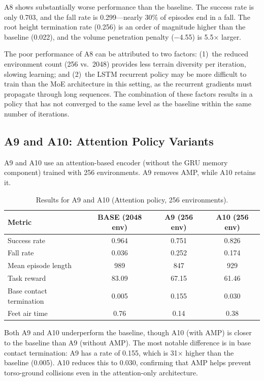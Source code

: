 A8 shows substantially worse performance than the baseline. The success rate is only 0.703, and the fall rate is 0.299---nearly 30\% of episodes end in a fall. The root height termination rate (0.256) is an order of magnitude higher than the baseline (0.022), and the volume penetration penalty ($-$4.55) is 5.5$\times$ larger.

The poor performance of A8 can be attributed to two factors: (1)~the reduced environment count (256 vs.\ 2048) provides less terrain diversity per iteration, slowing learning; and (2)~the LSTM recurrent policy may be more difficult to train than the MoE architecture in this setting, as the recurrent gradients must propagate through long sequences. The combination of these factors results in a policy that has not converged to the same level as the baseline within the same number of iterations.

\subsection{A9 and A10: Attention Policy Variants}

A9 and A10 use an attention-based encoder (without the GRU memory component) trained with 256 environments. A9 removes AMP, while A10 retains it.

\begin{table}[t]
\centering
\caption{Results for A9 and A10 (Attention policy, 256 environments).}
\label{tab:a9_a10_results}
\begin{tabular}{lccc}
\toprule
\textbf{Metric} & \textbf{BASE (2048 env)} & \textbf{A9 (256 env)} & \textbf{A10 (256 env)} \\
\midrule
Success rate & 0.964 & 0.751 & 0.826 \\
Fall rate & 0.036 & 0.252 & 0.174 \\
Mean episode length & 989 & 847 & 929 \\
Task reward & 83.09 & 67.15 & 61.46 \\
Base contact termination & 0.005 & 0.155 & 0.030 \\
Feet air time & 0.76 & 0.14 & 0.38 \\
\bottomrule
\end{tabular}
\end{table}

Both A9 and A10 underperform the baseline, though A10 (with AMP) is closer to the baseline than A9 (without AMP). The most notable difference is in base contact termination: A9 has a rate of 0.155, which is 31$\times$ higher than the baseline (0.005). A10 reduces this to 0.030, confirming that AMP helps prevent torso-ground collisions even in the attention-only architecture.

